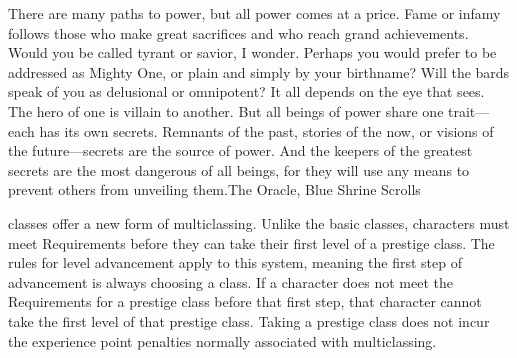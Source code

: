 {There are many paths to power, but all power comes at a price. Fame or infamy follows those who make great sacrifices and who reach grand achievements. Would you be called tyrant or savior, I wonder. Perhaps you would prefer to be addressed as Mighty One, or plain and simply by your birthname? Will the bards speak of you as delusional or omnipotent? It all depends on the eye that sees. The hero of one is villain to another. But all beings of power share one trait---each has its own secrets. Remnants of the past, stories of the now, or visions of the future---secrets are the source of power. And the keepers of the greatest secrets are the most dangerous of all beings, for they will use any means to prevent others from unveiling them.}{The Oracle, Blue Shrine Scrolls}

 classes offer a new form of multiclassing. Unlike the basic classes, characters must meet Requirements before they can take their first level of a prestige class. The rules for level advancement apply to this system, meaning the first step of advancement is always choosing a class. If a character does not meet the Requirements for a prestige class before that first step, that character cannot take the first level of that prestige class. Taking a prestige class does not incur the experience point penalties normally associated with multiclassing.


